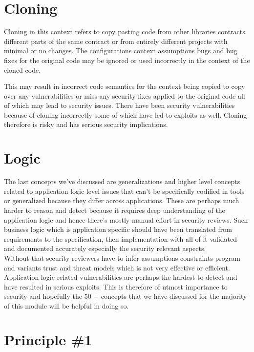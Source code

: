 \section{Cloning}
Cloning in this context refers to copy pasting code from other libraries contracts different parts of the same contract or from entirely different projects with minimal or no changes. The configurations context assumptions bugs and bug fixes for the original code may be ignored or used incorrectly in the context of the cloned code. 

This may result in incorrect code semantics for the context being copied to copy over any vulnerabilities or miss any security fixes applied to the original code all of which may lead to security issues. There have been security vulnerabilities because of cloning incorrectly some of which have led to exploits as well. Cloning therefore is risky and has serious security implications.

\section{Logic}

The last concepts we've discussed are generalizations and higher level concepts related to application logic level issues that can't be specifically codified in tools or generalized because they differ across applications. These are perhaps much harder to reason and detect because it requires deep understanding of the application logic and hence there's mostly manual effort in security reviews. Such business logic which is application specific should have been translated from requirements to the specification, then implementation with all of it validated and documented accurately especially the security relevant aspects.\\

Without that security reviewers have to infer assumptions constraints program and variants trust and threat models which is not very effective or efficient. Application logic related vulnerabilities are perhaps the hardest to detect and have resulted in serious exploits. This is therefore of utmost importance to security and hopefully the 50 + concepts that we have discussed for the majority of this module will be helpful in doing so.

\section{Principle \#1}

